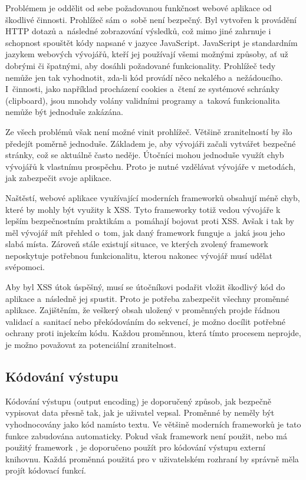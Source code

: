 \documentclass[11pt, conference, a4paper]{IEEEtran}
\begin{document}
Problémem je oddělit od sebe požadovanou funkčnost webové aplikace od škodlivé činnosti. Prohlížeč sám o~sobě není bezpečný. Byl vytvořen k provádění HTTP dotazů a~následné zobrazování výsledků, což mimo jiné zahrnuje i schopnost spouštět kódy napsané v jazyce JavaScript. JavaScript je standardním jazykem webových vývojářů, kteří jej používají všemi možnými způsoby, ať už dobrými či špatnými, aby dosáhli požadované funkcionality. Prohlížeč tedy nemůže jen tak vyhodnotit, zda-li kód provádí něco nekalého a~nežádoucího. I~činnosti, jako například procházení cookies a~čtení ze systémové schránky (clipboard), jsou mnohdy volány validními programy a~taková funkcionalita nemůže být jednoduše zakázána.

Ze všech problémů však není možné vinit prohlížeč. Většině zranitelností by šlo předejít poměrně jednoduše. Základem je, aby vývojáři začali vytvářet bezpečné stránky, což se aktuálně často neděje. Útočníci mohou jednoduše využít chyb vývojářů k vlastnímu prospěchu. Proto je nutné vzdělávat vývojáře v metodách, jak zabezpečit svoje aplikace.~\cite{Grossman2007}


Naštěstí, webové aplikace využívající moderních frameworků obsahují méně chyb, které by mohly být využity k XSS. Tyto frameworky totiž vedou vývojáře k lepším bezpečnostním praktikám a~pomáhají bojovat proti XSS. Avšak i tak by měl vývojář mít přehled o~tom, jak daný framework funguje a~jaká jsou jeho slabá místa. Zároveň stále existují situace, ve kterých zvolený framework neposkytuje potřebnou funkcionalitu, kterou nakonec vývojář musí udělat svépomoci.


Aby byl XSS útok úspěšný, musí se útočníkovi podařit vložit škodlivý kód do aplikace a~následně jej spustit. Proto je potřeba zabezpečit všechny proměnné aplikace. Zajištěním, že veškerý obsah uložený v proměnných projde řádnou validací a~sanitací nebo překódováním do  sekvencí, je možno docílit potřebné ochrany proti injekcím kódu. Každou proměnnou, která tímto procesem neprojde, je možno považovat za potenciální zranitelnost.

\subsection{Kódování výstupu} %
Kódování výstupu (output encoding) je doporučený způsob, jak bezpečně vypisovat data přesně tak, jak je uživatel vepsal. Proměnné by neměly být vyhodnocovány jako kód namísto textu. Ve většině moderních frameworků je tato funkce zabudována automaticky. Pokud však framework není použit, nebo má použitý framework , je doporučeno použít pro kódování výstupu externí knihovnu. Každá proměnná použitá pro v uživatelském rozhraní by správně měla projít kódovací funkcí.
\end{document}
